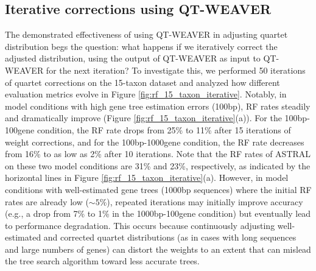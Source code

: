 \documentclass[10pt,a4paper]{article}
\begin{document}
\subsection{Iterative corrections using QT-WEAVER}

The demonstrated effectiveness of using QT-WEAVER in adjusting quartet distribution begs the question: what happens if we iteratively correct the adjusted distribution, using the output of QT-WEAVER as input to QT-WEAVER for the next iteration? To investigate this, we performed 50 iterations of quartet corrections on the 15-taxon dataset and analyzed how different evaluation metrics evolve in Figure \ref{fig:rf_15_taxon_iterative}. Notably, in model conditions with high gene tree estimation errors (100bp), RF rates steadily and dramatically improve (Figure \ref{fig:rf_15_taxon_iterative}(a)). For the 100bp-100gene condition, the RF rate drops from 25\% to 11\% after 15 iterations of weight corrections, and for the 100bp-1000gene condition, the RF rate decreases from 16\% to as low as 2\% after 10 iterations. Note that the RF rates of ASTRAL on these two model conditions are 31\% and 23\%, respectively, as indicated by the horizontal lines in Figure \ref{fig:rf_15_taxon_iterative}(a). However, in model conditions with well-estimated gene trees (1000bp sequences) where the initial RF rates are already low ($\sim 5\%$), repeated iterations may initially improve accuracy (e.g., a drop from 7\% to 1\% in the 1000bp-100gene condition) but eventually lead to performance degradation. This occurs because continuously adjusting well-estimated and corrected quartet distributions (as in cases with long sequences and large numbers of genes) can distort the weights to an extent that can mislead the tree search algorithm toward less accurate trees.

\end{document}
